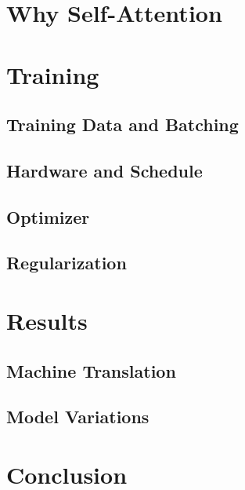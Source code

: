 \documentclass[twocolumn]{jarticle}     %
\begin{document}
\section{Why Self-Attention}

\section{Training}

\subsection{Training Data and Batching}

\subsection{Hardware and Schedule}

\subsection{Optimizer}

\subsection{Regularization}

\section{Results}

\subsection{Machine Translation}

\subsection{Model Variations}

\section{Conclusion}




\end{document}
